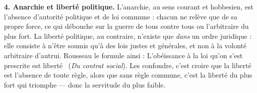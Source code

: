 \documentclass[11pt]{article}
\begin{document}
\begin{corrige}
\textbf{4. Anarchie et liberté politique.} L'anarchie, au sens courant et hobbesien, est l'absence d'autorité politique et de loi commune : chacun ne relève que de sa propre force, ce qui débouche sur la guerre de tous contre tous ou l'arbitraire du plus fort. La liberté politique, au contraire, n'existe que \emph{dans} un ordre juridique : elle consiste à n'être soumis qu'à des lois justes et générales, et non à la volonté arbitraire d'autrui. Rousseau le formule ainsi : \guillemotleft L'obéissance à la loi qu'on s'est prescrite est liberté \guillemotright\ (\emph{Du contrat social}). Les confondre, c'est croire que la liberté est l'absence de toute règle, alors que sans règle commune, c'est la liberté du plus fort qui triomphe — donc la servitude du plus faible.

\end{corrige}
\end{document}
